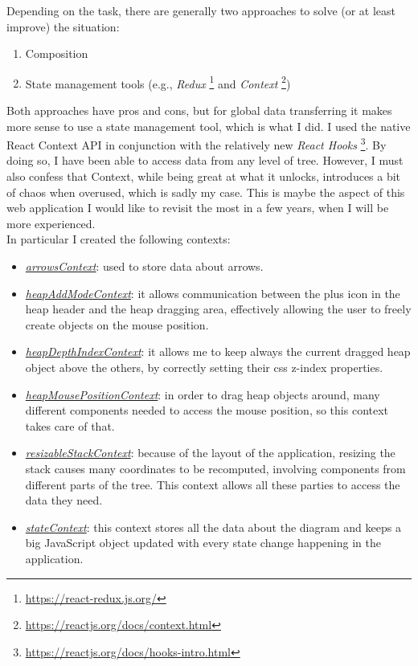 \documentclass[]{usiinfbachelorproject}
\begin{document}
\noindent Depending on the task, there are generally two approaches to solve (or at least improve) the situation:

\begin{enumerate}
	\item Composition
	\item State management tools (e.g., \emph{Redux} \footnote{\url{https://react-redux.js.org/}} and \emph{Context} \footnote{\url{https://reactjs.org/docs/context.html}})
\end{enumerate}

\noindent Both approaches have pros and cons, but for global data transferring it makes more sense to use a state management tool, which is what I did. I used the native React Context API in conjunction with the relatively new \emph{React Hooks} \footnote{\url{https://reactjs.org/docs/hooks-intro.html}}. By doing so, I have been able to access data from any level of tree. However, I must also confess that Context, while being great at what it unlocks, introduces a bit of chaos when overused, which is sadly my case. This is maybe the aspect of this web application I would like to revisit the most in a few years, when I will be more experienced.\\

\noindent In particular I created the following contexts:

\begin{itemize}
	\item \ul{\emph{arrowsContext}}: used to store data about arrows.
	\item \ul{\emph{heapAddModeContext}}: it allows communication between the plus icon in the heap header and the heap dragging area, effectively allowing the user to freely create objects on the mouse position.
	\item \ul{\emph{heapDepthIndexContext}}: it allows me to keep always the current dragged heap object above the others, by correctly setting their css z-index properties.
	\item \ul{\emph{heapMousePositionContext}}: in order to drag heap objects around, many different components needed to access the mouse position, so this context takes care of that.
	\item \ul{\emph{resizableStackContext}}: because of the layout of the application, resizing the stack causes many coordinates to be recomputed, involving components from different  parts of the tree. This context allows all these parties to access the data they need.
	\item \ul{\emph{stateContext}}: this context stores all the data about the diagram and keeps a big JavaScript object updated with every state change happening in the application.
\end{itemize}
\end{document}
